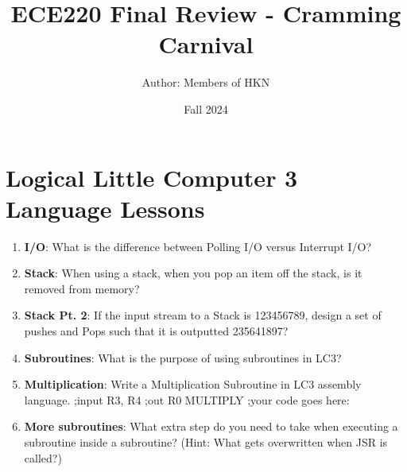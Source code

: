 \documentclass{article}
\title{ECE220 Final Review - Cramming Carnival}
\author{Author: Members of HKN}
\date{Fall 2024}
\begin{document}
\maketitle

\section{
Logical Little Computer 3 Language Lessons}
\begin{enumerate}[label=(\alph*), itemsep = 120pt]
    \item \textbf{I/O}: What is the difference between Polling I/O versus Interrupt I/O?
    

    \item \textbf{Stack}: When using a stack, when you pop an item off the stack, is it removed from memory?

    
    \item \textbf{Stack Pt. 2}: If the input stream to a Stack is 123456789, design a set of pushes and Pops such that it is outputted 235641897?
    
    \item \textbf{Subroutines}: What is the purpose of using subroutines in LC3?
    
    \item \textbf{Multiplication}: Write a Multiplication Subroutine in LC3 assembly language.
    \newline
    ;input R3, R4 \newline
    ;out R0 \newline
    MULTIPLY \newline
    ;your code goes here: \newline
    \newpage

    
     \item 
    \textbf{More subroutines}: What extra step do you need to take when executing a subroutine inside a subroutine? (Hint: What gets overwritten when JSR is called?)
    
    \end{enumerate}

   

\newpage
\end{document}
